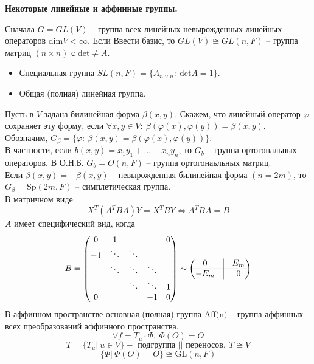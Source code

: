 \documentclass[a4paper, 12pt]{article}
\theoremstyle{definition}
\begin{document}
        \begin{center}
            \textbf{Некоторые линейные и аффинные группы.} 
        \end{center}
        Сначала $G = GL(V)$ -- группа всех линейных невырожденных линейных операторов dim$V < \infty$. Если Ввести базис, то $GL(V) \cong GL(n,F)$ -- группа матриц $(n\times n)$ с det$\neq A$.
        \begin{itemize}
            \item Специальная группа $SL(n,F) = \{A_{n\times n}:\ \text{det}A = 1\}$.
            \item Общая (полная) линейная группа. 
        \end{itemize}
        Пусть в $V$ задана билинейная форма $\beta(x,y)$. Скажем, что линейный оператор $\varphi$ сохраняет эту форму, если $\forall x,y \in V:\ \beta(\varphi(x), \varphi(y)) = \beta(x,y)$.\\
        Обозначим, $G_\beta = \{\varphi:\ \beta(x,y) = \beta(\varphi(x), \varphi(y))\}$.\\
        В частности, если $b(x,y) = x_1y_1 + ... + x_ny_n$, то $G_b$ -- группа ортогональных операторов. В О.Н.Б. $G_b = O(n,F)$ -- группа ортогонаьльных матриц.\\
        Если $\beta(x,y) = - \beta(x,y)$ -- невырожденная билинейная форма $(n = 2m)$, то 
        $G_\beta = \text{Sp}(2m,F)$ -- симплетическая группа.\\
        В матричном виде:
        $$X^T(A^TBA)Y = X^TBY \Longleftrightarrow A^TBA = B$$
        $A$ имеет специфический вид, когда 
        $$B = \begin{pmatrix}
            0 & 1 & \null & \null & 0\\
                -1 & \ddots & \ddots & \null & \null\\
                \null & \ddots & \ddots & \ddots & \null\\
                \null & \null & \ddots & \ddots & 1\\
                0 & \null & \null & -1 & 0
        \end{pmatrix} \sim \begin{pmatrix}
            0 & \vline & E_m\\
            \hline
            - E_m & \vline & 0
        \end{pmatrix}$$
        В аффинном пространстве основная (полная) группа $\text{Aff(n)}$ -- группа аффинных всех преобразований аффинного пространства.
        $$\forall f = T_u\cdot \Phi,\ \Phi(O) = O$$
        $$T = \{T_u|\ u \in V\} - \text{ подгруппа || переносов},\ T \cong V$$
        $$\{\Phi|\ \Phi(O) = O\} \cong \text{GL}(n,F)$$










 







    
\end{document}
